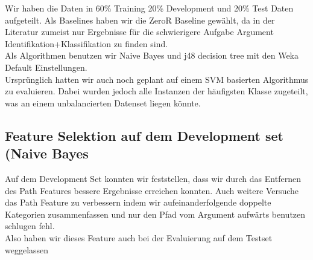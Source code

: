 \documentclass[]{article}
\begin{document}
Wir haben die Daten in 60\% Training 20\% Development und 20\% Test Daten aufgeteilt. 
Als Baselines haben wir die ZeroR Baseline gewählt, da in der Literatur zumeist nur Ergebnisse für die schwierigere Aufgabe Argument Identifikation+Klassifikation zu finden sind. \\
Als Algorithmen benutzen wir Naive Bayes und j48 decision tree mit den Weka Default Einstellungen. \\
Ursprünglich hatten wir auch noch geplant auf einem SVM basierten Algorithmus zu evaluieren. 
Dabei wurden jedoch alle Instanzen der häufigsten Klasse zugeteilt, was an einem unbalancierten Datenset liegen könnte.

\subsection{Feature Selektion auf dem Development set (Naive Bayes}
\begin{table}[h]
\end{table}

Auf dem Development Set konnten wir feststellen, dass wir durch das Entfernen des Path Features bessere Ergebnisse erreichen konnten.
Auch weitere Versuche das Path Feature zu verbessern indem wir aufeinanderfolgende doppelte Kategorien zusammenfassen und nur den Pfad vom Argument aufwärts benutzen schlugen fehl. \\
Also haben wir dieses Feature auch bei der Evaluierung auf dem Testset weggelassen
\end{document}
